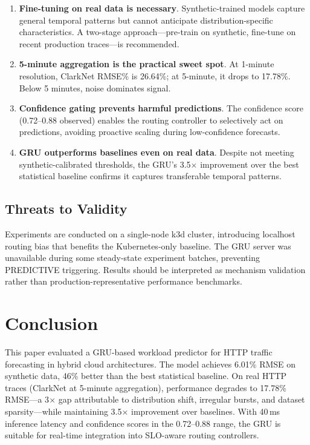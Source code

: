 \documentclass[conference,letterpaper]{IEEEtran}
\begin{document}
\begin{enumerate}
    \item \textbf{Fine-tuning on real data is necessary}. Synthetic-trained models capture general temporal patterns but cannot anticipate distribution-specific characteristics. A two-stage approach---pre-train on synthetic, fine-tune on recent production traces---is recommended.

    \item \textbf{5-minute aggregation is the practical sweet spot}. At 1-minute resolution, ClarkNet RMSE\% is 26.64\%; at 5-minute, it drops to 17.78\%. Below 5 minutes, noise dominates signal.

    \item \textbf{Confidence gating prevents harmful predictions}. The confidence score (0.72--0.88 observed) enables the routing controller to selectively act on predictions, avoiding proactive scaling during low-confidence forecasts.

    \item \textbf{GRU outperforms baselines even on real data}. Despite not meeting synthetic-calibrated thresholds, the GRU's 3.5$\times$ improvement over the best statistical baseline confirms it captures transferable temporal patterns.
\end{enumerate}

\subsection{Threats to Validity}

Experiments are conducted on a single-node k3d cluster, introducing localhost routing bias that benefits the Kubernetes-only baseline. The GRU server was unavailable during some steady-state experiment batches, preventing PREDICTIVE triggering. Results should be interpreted as mechanism validation rather than production-representative performance benchmarks.

\section{Conclusion}

This paper evaluated a GRU-based workload predictor for HTTP traffic forecasting in hybrid cloud architectures. The model achieves 6.01\% RMSE on synthetic data, 46\% better than the best statistical baseline. On real HTTP traces (ClarkNet at 5-minute aggregation), performance degrades to 17.78\% RMSE---a 3$\times$ gap attributable to distribution shift, irregular bursts, and dataset sparsity---while maintaining 3.5$\times$ improvement over baselines. With 40\,ms inference latency and confidence scores in the 0.72--0.88 range, the GRU is suitable for real-time integration into SLO-aware routing controllers.
\end{document}
